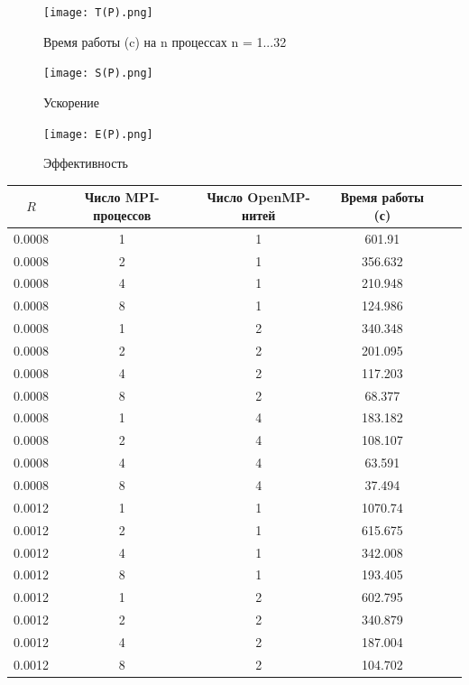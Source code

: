\begin{figure}[h]
    \centering
    \texttt{[image: T(P).png]}
    \caption{Время работы (c) на n процессах n = 1...32}
    \label{fig:mesh1}
\end{figure}

\begin{figure}[h]
    \centering
    \texttt{[image: S(P).png]}
    \caption{Ускорение}
    \label{fig:mesh1}
\end{figure}

\begin{figure}[h]
    \centering
    \texttt{[image: E(P).png]}
    \caption{Эффективность}
    \label{fig:mesh1}
\end{figure}

\begin{table}[h]
\begin{tabular}{|c|c|c|c|c|c|}
    \hline
    $R$ & Число MPI-процессов & Число OpenMP-нитей & Время работы (с)  \\
    \hline\hline
    0.0008 &  1  & 1  &  601.91 \\
    0.0008 &  2  & 1  &  356.632 \\
    0.0008 &  4  & 1  &  210.948 \\
    0.0008 &  8  & 1  &  124.986 \\
    \hline
    0.0008 &  1  & 2  &  340.348 \\
    0.0008 &  2  & 2  &  201.095 \\
    0.0008 &  4  & 2  &  117.203 \\
    0.0008 &  8  & 2  &  68.377 \\
    \hline
    0.0008 &  1  & 4  &  183.182 \\
    0.0008 &  2  & 4  &  108.107 \\
    0.0008 &  4  & 4  &  63.591 \\
    0.0008 &  8  & 4  &  37.494 \\
    \hline\hline
    0.0012 &  1  & 1  &  1070.74 \\
    0.0012 &  2  & 1  &  615.675 \\
    0.0012 &  4  & 1  &  342.008 \\
    0.0012 &  8  & 1  &  193.405 \\
    \hline
    0.0012 &  1  & 2  &  602.795 \\
    0.0012 &  2  & 2  &  340.879 \\
    0.0012 &  4  & 2  &  187.004 \\
    0.0012 &  8  & 2  &  104.702 \\

\end{tabular}
\end{table}
